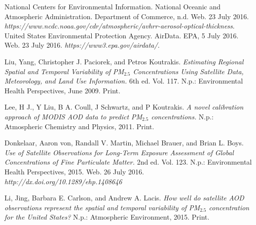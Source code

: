 \documentclass[10pt]{article}
\begin{document}
\begin{thebibliography}{99}

 National Centers for Environmental Information. National Oceanic and Atmospheric Administration. Department of Commerce, n.d. Web. 23 July 2016. \textit{https://www.ncdc.noaa.gov/cdr/atmospheric/avhrr-aerosol-optical-thickness}.
 United States Environmental Protection Agency. AirData. EPA, 5 July 2016. Web. 23 July 2016. \textit{https://www3.epa.gov/airdata/}.

 Liu, Yang, Christopher J. Paciorek, and Petros Koutrakis. \textit{Estimating Regional Spatial and Temporal Variability of PM$_{2.5}$ Concentrations Using Satellite Data, Meteorology, and Land Use Information.} 6th ed. Vol. 117. N.p.: Environmental Health Perspectives, June 2009. Print.

 Lee, H J., Y Liu, B A. Coull, J Schwartz, and P Koutrakis. \textit{A novel calibration approach of MODIS AOD data to predict PM$_{2.5}$ concentrations.} N.p.: Atmospheric Chemistry and Physics, 2011. Print.

 Donkelaar, Aaron von, Randall V. Martin, Michael Brauer, and Brian L. Boys. \textit{Use of Satellite Observations for Long-Term Exposure Assessment of Global Concentrations of Fine Particulate Matter.} 2nd ed. Vol. 123. N.p.: Environmental Health Perspectives, 2015. Web. 26 July 2016. \textit{http://dx.doi.org/10.1289/ehp.1408646}

 Li, Jing, Barbara E. Carlson, and Andrew A. Lacis. \textit{ How well do satellite AOD observations represent the spatial and temporal variability of PM$_{2.5}$ concentration for the United States?} N.p.: Atmospheric Environment, 2015. Print.


\end{thebibliography}
\end{document}
